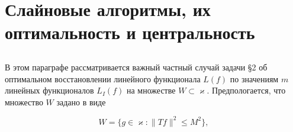 \documentclass{book}
\begin{document}
\section{Слайновые алгоритмы, их оптимальность и центральность}
\setcounter{equation}{0}

\subsection{} В этом параграфе рассматривается важный частный случай задачи \S 2 об оптимальном восстановлении линейного функционала $L(f)$ по значениям $m$ линейных функционалов $L_I(f)$ на множестве $W\subset\varkappa$. Предпологается, что множество $W$ задано в виде

\begin{equation}
W=\{g\in\varkappa:\|Tf\|^2\leq M^2\},
\end{equation}
\end{document}
